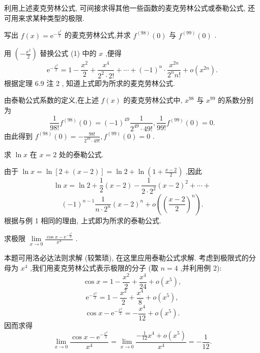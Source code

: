 利用上述麦克劳林公式, 可间接求得其他一些函数的麦克劳林公式或泰勒公式, 还可用来求某种类型的极限.

\begin{example}
写出 \(f\left( x\right)  = {\mathrm{e}}^{-\frac{{x}^{2}}{2}}\) 的麦克劳林公式,并求 \({f}^{\left( {98}\right) }\left( 0\right)\) 与 \({f}^{\left( {99}\right) }\left( 0\right)\) .
\end{example}


\begin{solution}
用 \(\left( {-\frac{{x}^{2}}{2}}\right)\) 替换公式 (1) 中的 \(x\) ,便得
\[
{\mathrm{e}}^{-\frac{{x}^{2}}{2}} = 1 - \frac{{x}^{2}}{2} + \frac{{x}^{4}}{{2}^{2} \cdot  2!} + \cdots  + {\left( -1\right) }^{n} \cdot  \frac{{x}^{2n}}{{2}^{n}n!} + o\left( {x}^{2n}\right) .
\]
根据定理 6.9 注 2 , 知道上式即为所求的麦克劳林公式.

由泰勒公式系数的定义,在上述 \(f\left( x\right)\) 的麦克劳林公式中, \({x}^{98}\) 与 \({x}^{99}\) 的系数分别为
\[
\frac{1}{{98}!}{f}^{\left( {98}\right) }\left( 0\right)  = {\left( -1\right) }^{49}\frac{1}{{2}^{49} \cdot  {49}!},\frac{1}{{99}!}{f}^{\left( {99}\right) }\left( 0\right)  = 0.
\]
由此得到 \({f}^{\left( {98}\right) }\left( 0\right)  =  - \frac{{98}!}{{2}^{49} \cdot  {49}!},{f}^{\left( {99}\right) }\left( 0\right)  = 0\) .
\end{solution}


\begin{example}
求 \(\ln x\) 在 \(x = 2\) 处的泰勒公式.
\end{example}


\begin{solution}
由于 \(\ln x = \ln \left\lbrack  {2 + \left( {x - 2}\right) }\right\rbrack   = \ln 2 + \ln \left( {1 + \frac{x - 2}{2}}\right)\) ,因此
\[
\ln x = \ln 2 + \frac{1}{2}\left( {x - 2}\right)  - \frac{1}{2 \cdot  {2}^{2}}{\left( x - 2\right) }^{2} + \cdots  +
\]
\[
{\left( -1\right) }^{n - 1}\frac{1}{n \cdot  {2}^{n}}{\left( x - 2\right) }^{n} + o\left( {\left( \frac{x - 2}{2}\right) }^{n}\right) .
\]
根据与例 1 相同的理由, 上式即为所求的泰勒公式.
\end{solution}


\begin{example}
求极限 \(\mathop{\lim }\limits_{{x \rightarrow  0}}\frac{\cos x - {\mathrm{e}}^{-\frac{{x}^{2}}{2}}}{{x}^{4}}\) .
\end{example}


\begin{solution}
本题可用洛必达法则求解 (较繁琐), 在这里应用泰勒公式求解. 考虑到极限式的分母为 \({x}^{4}\) ,我们用麦克劳林公式表示极限的分子 (取 \(n = 4\) ,并利用例 2):
\[
\cos x = 1 - \frac{{x}^{2}}{2} + \frac{{x}^{4}}{24} + o\left( {x}^{5}\right) ,
\]
\[
{\mathrm{e}}^{-\frac{{x}^{2}}{2}} = 1 - \frac{{x}^{2}}{2} + \frac{{x}^{4}}{8} + o\left( {x}^{5}\right) ,
\]
\[
\cos x - {\mathrm{e}}^{-\frac{{x}^{2}}{2}} =  - \frac{{x}^{4}}{12} + o\left( {x}^{5}\right) .
\]
因而求得
\[
\mathop{\lim }\limits_{{x \rightarrow  0}}\frac{\cos x - {\mathrm{e}}^{-\frac{{x}^{2}}{2}}}{{x}^{4}} = \mathop{\lim }\limits_{{x \rightarrow  0}}\frac{-\frac{1}{12}{x}^{4} + o\left( {x}^{5}\right) }{{x}^{4}} =  - \frac{1}{12}.
\]
\end{solution}

